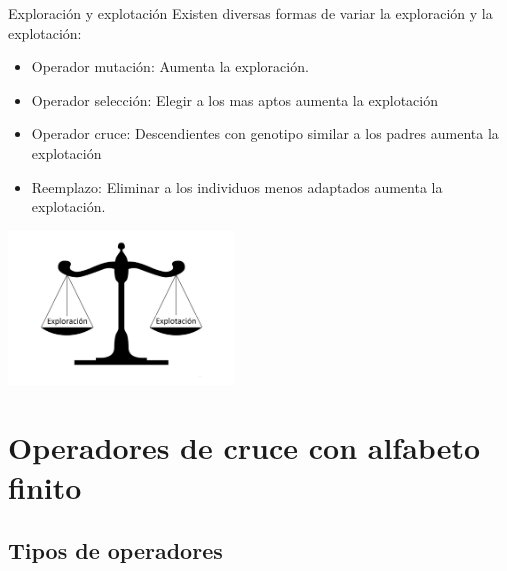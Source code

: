 \documentclass[10pt]{beamer}
\begin{document}
\begin{frame}{Exploración y explotación}
	Existen diversas formas de variar la exploración y la explotación: 
	
	\begin{itemize}

		\item Operador mutación: Aumenta la exploración.

		\item Operador selección: Elegir a los mas aptos aumenta la explotación
		
		\item Operador cruce: Descendientes con genotipo similar a los padres aumenta la explotación
		
		\item Reemplazo: Eliminar a los individuos menos adaptados aumenta la explotación.

	\end{itemize}
	\begin{center}
\includegraphics[width=170pt]{balanza}
	\end{center}
\end{frame}

\section{Operadores de cruce con alfabeto finito}

\subsection{Tipos de operadores}
\end{document}
